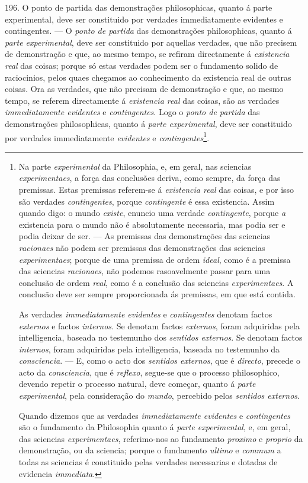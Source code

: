196. O ponto de partida das demonstrações philosophicas, quanto á parte experimental, deve ser constituido por verdades immediatamente evidentes e contingentes. --- O \emph{ponto de partida} das demonstrações philosophicas, quanto á \emph{parte experimental}, deve ser constituido por aquellas verdades, que não precisem de demonstração e que, ao mesmo tempo, se refiram directamente á \emph{existencia real} das coisas; porque só estas verdades podem ser o fundamento solido de raciocinios, pelos quaes chegamos ao conhecimento da existencia real de outras coisas. Ora as verdades, que não precisam de demonstração e que, ao mesmo tempo, se referem directamente á \emph{existencia real} das coisas, são as verdades \emph{immediatamente evidentes} e \emph{contingentes}. Logo o \emph{ponto de partida} das demonstrações philosophicas, quanto á \emph{parte experimental}, deve ser constituido por verdades immediatamente \emph{evidentes} e \emph{contingentes}\footnote{Na parte \emph{experimental} da Philosophia, e, em geral, nas sciencias \emph{experimentaes}, a força das conclusões deriva, como sempre, da força das premissas. Estas premissas referem-se á \emph{existencia real} das coisas, e por isso são verdades \emph{contingentes}, porque \emph{contingente} é essa existencia. Assim quando digo: o mundo \emph{existe}, enuncio uma verdade \emph{contingente}, porque \emph{a} existencia para o mundo não é absolutamente necessaria, mas podia ser e podia deixar de ser. --- As premissas das demonstrações das sciencias \emph{racionaes} não podem ser premissas das demonstrações das sciencias \emph{expe}\emph{rimentaes}; porque de uma premissa de ordem \emph{ideal}, como é a premissa das sciencias \emph{racionaes}, não podemos rasoavelmente passar para uma conclusão de ordem \emph{real}, como é a conclusão das sciencias \emph{experimentaes}. A conclusão deve ser sempre proporcionada ás premissas, em que está contida.\par As verdades \emph{immediatamente evidentes} e \emph{contingentes} denotam factos \emph{externos} e factos \emph{internos}. Se denotam factos \emph{externos}, foram adquiridas pela intelligencia, baseada no testemunho dos \emph{sentidos externos}. Se denotam factos \emph{internos}, foram adquiridas pela intelligencia, baseada no testemunho da \emph{consciencia}. --- E, como o acto dos \emph{sentidos externos}, que é \emph{directo}, precede o acto da \emph{consciencia}, que é \emph{reflexo}, segue-se que o processo philosophico, devendo repetir o processo natural, deve começar, quanto á \emph{parte experimental}, pela consideração do \emph{mundo}, percebido pelos \emph{sentidos externos}.\par Quando dizemos que as verdades \emph{immediatamente evidentes} e \emph{contingentes} são o fundamento da Philosophia quanto á \emph{parte experimental}, e, em geral, das sciencias \emph{experimentaes}, referimo-nos ao fundamento \emph{proximo} e \emph{proprio} da demonstração, ou da sciencia; porque o fundamento \emph{ultimo} e \emph{commum} a todas as sciencias é constituido pelas verdades necessarias e dotadas de evidencia \emph{immediata}.}.

